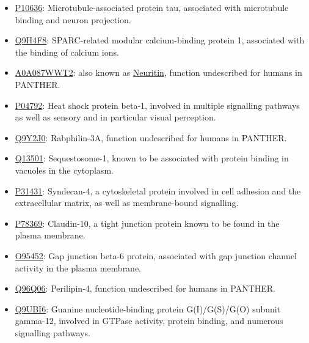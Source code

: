 \begin{itemize}
\item \href{http://www.pantherdb.org/genes/gene.do?acc=HUMAN\%7CHGNC\%3D6893\%7CUniProtKB\%3DP10636}{P10636}: Microtubule-associated protein tau, associated with microtubule binding and neuron projection.
\item \href{http://www.pantherdb.org/genes/gene.do?acc=HUMAN\%7CHGNC\%3D20318\%7CUniProtKB\%3DQ9H4F8}{Q9H4F8}: SPARC-related modular calcium-binding protein 1, associated with the binding of calcium ions.
\item \href{http://www.pantherdb.org/genes/gene.do?acc=HUMAN\%7CHGNC\%3D17972\%7CUniProtKB\%3DQ9NPD7}{A0A087WWT2}: also known as \href{https://www.uniprot.org/uniprot/A0A087WWT2}{Neuritin}, function undescribed for humans in PANTHER.
\item \href{http://www.pantherdb.org/genes/gene.do?acc=HUMAN\%7CHGNC\%3D5246\%7CUniProtKB\%3DP04792}{P04792}: Heat shock protein beta-1, involved in multiple signalling pathways as well as sensory and in particular visual perception.
\item \href{http://www.pantherdb.org/genes/gene.do?acc=HUMAN\%7CHGNC\%3D17056\%7CUniProtKB\%3DQ9Y2J0}{Q9Y2J0}: Rabphilin-3A, function undescribed for humans in PANTHER.
\item \href{http://www.pantherdb.org/genes/gene.do?acc=HUMAN\%7CHGNC\%3D11280\%7CUniProtKB\%3DQ13501}{Q13501}: Sequestosome-1, known to be associated with protein binding in vacuoles in the cytoplasm.
\item \href{http://www.pantherdb.org/genes/gene.do?acc=HUMAN\%7CHGNC\%3D10661\%7CUniProtKB\%3DP31431}{P31431}: Syndecan-4, a cytoskeletal protein involved in cell adhesion and the extracellular matrix, as well as membrane-bound signalling.
\item \href{http://www.pantherdb.org/genes/gene.do?acc=HUMAN\%7CHGNC\%3D2033\%7CUniProtKB\%3DP78369}{P78369}:  Claudin-10,  a tight junction protein known to be found in the plasma membrane.
\item \href{http://www.pantherdb.org/genes/gene.do?acc=HUMAN\%7CHGNC\%3D4288\%7CUniProtKB\%3DO95452}{O95452}: Gap junction beta-6 protein, associated with gap junction channel activity in the plasma membrane.
\item \href{http://www.pantherdb.org/genes/gene.do?acc=HUMAN\%7CHGNC\%3D29393\%7CUniProtKB\%3DQ96Q06}{Q96Q06}: Perilipin-4, function undescribed for humans in PANTHER.
\item \href{http://www.pantherdb.org/genes/gene.do?acc=HUMAN\%7CHGNC\%3D19663\%7CUniProtKB\%3DQ9UBI6}{Q9UBI6}: Guanine nucleotide-binding protein G(I)/G(S)/G(O) subunit gamma-12, involved in GTPase activity, protein binding, and numerous signalling pathways.

\end{itemize}
